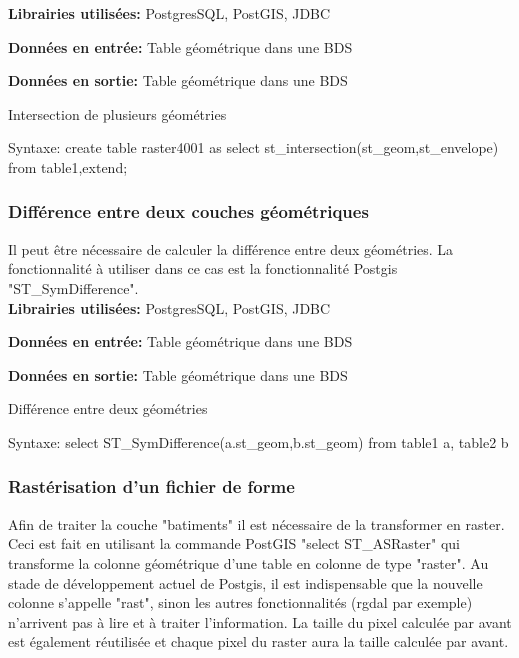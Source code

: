 \textbf{Librairies utilisées:} PostgresSQL, PostGIS, JDBC 

\textbf{Données en entrée:}  Table géométrique dans une BDS

\textbf{Données en sortie:}  Table géométrique dans une BDS \\

\begin{algorithm}[H]
\caption{\label{traitementintersect} Intersection de plusieurs géométries}
Syntaxe:
create table raster4001 as select st\_intersection(st\_geom,st\_envelope) from table1,extend;\\
\end{algorithm}


\subsubsection{Différence entre deux couches géométriques}

Il peut être nécessaire de calculer la différence entre deux géométries. La fonctionnalité à utiliser dans ce cas est la fonctionnalité Postgis "ST\_SymDifference". \\

\textbf{Librairies utilisées:} PostgresSQL, PostGIS, JDBC 

\textbf{Données en entrée:}  Table géométrique dans une BDS

\textbf{Données en sortie:}  Table géométrique dans une BDS \\

\begin{algorithm}[H]
\caption{\label{traitementsymdiff} Différence entre deux géométries}
Syntaxe:
select ST\_SymDifference(a.st\_geom,b.st\_geom) from table1 a, table2 b\\
\end{algorithm}



\subsubsection{Rastérisation d'un fichier de forme}

Afin de traiter la couche "batiments" il est nécessaire de la transformer en raster. Ceci est fait en utilisant la commande PostGIS "select ST\_ASRaster" qui transforme la colonne géométrique d'une table en colonne de type "raster". Au stade de développement actuel de Postgis, il est indispensable que la nouvelle colonne s'appelle "rast", sinon les autres fonctionnalités (rgdal par exemple) n'arrivent pas à lire et à traiter l'information. La taille du pixel calculée par avant est également réutilisée et chaque pixel du raster aura la taille calculée par avant.\\

